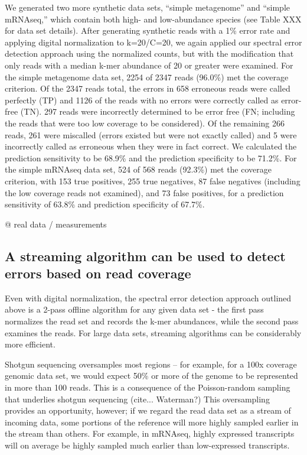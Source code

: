 We generated two more synthetic data sets, ``simple metagenome'' and
``simple mRNAseq,'' which contain both high- and low-abundance species
(see Table XXX for data set details).  After generating synthetic
reads with a 1\% error rate and applying digital normalization to
k=20/C=20, we again applied our spectral error detection approach
using the normalized counts, but with the modification that only reads
with a median k-mer abundance of 20 or greater were examined.  For the
simple metagenome data set, 2254 of 2347 reads (96.0\%) met the
coverage criterion.  Of the 2347 reads total, the errors in 658
erroneous reads were called perfectly (TP) and 1126 of the reads with
no errors were correctly called as error-free (TN).  297 reads were
incorrectly determined to be error free (FN; including the reads that
were too low coverage to be considered).  Of the remaining 266 reads,
261 were miscalled (errors existed but were not exactly called) and 5
were incorrectly called as erroneous when they were in fact correct.
We calculated the prediction sensitivity to be 68.9\% and the
prediction specificity to be 71.2\%.  For the simple mRNAseq data set,
524 of 568 reads (92.3\%) met the coverage criterion, with 153 true
positives, 255 true negatives, 87 false negatives (including the low
coverage reads not examined), and 73 false positives, for a prediction
sensitivity of 63.8\% and prediction specificity of 67.7\%.

@ real data / measurements

\subsection{A streaming algorithm can be used to detect errors based on read coverage}

Even with digital normalization, the spectral error detection approach
outlined above is a 2-pass offline algorithm for any given data set -
the first pass normalizes the read set and records the k-mer
abundances, while the second pass examines the reads.  For large data
sets, streaming algorithms can be considerably more efficient.

Shotgun sequencing oversamples most regions -- for example, for a 100x
coverage genomic data set, we would expect 50\% or more of the genome
to be represented in more than 100 reads.  This is a consequence of
the Poisson-random sampling that underlies shotgun sequencing
(cite... Waterman?)  This oversampling provides an opportunity,
however; if we regard the read data set as a stream of incoming data,
some portions of the reference will more highly sampled earlier in the
stream than others.  For example, in mRNAseq, highly expressed
transcripts will on average be highly sampled much earlier than
low-expressed transcripts.

